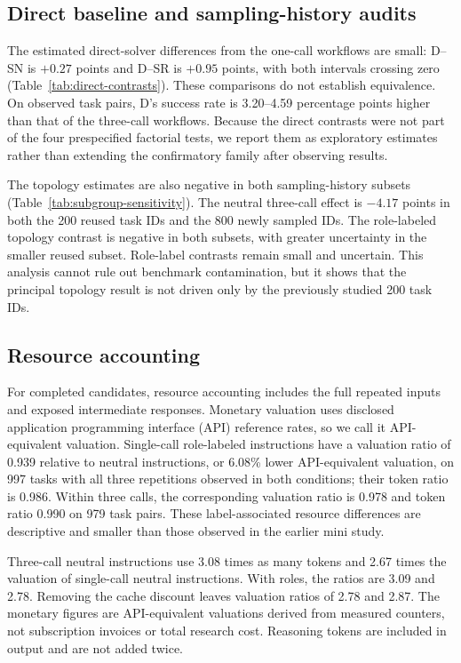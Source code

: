 

\subsection{Direct baseline and sampling-history audits}
The estimated direct-solver differences from the one-call workflows are small: D--SN is $+0.27$ points and D--SR is $+0.95$ points, with both intervals crossing zero (Table~\ref{tab:direct-contrasts}). These comparisons do not establish equivalence. On observed task pairs, D's success rate is 3.20--4.59 percentage points higher than that of the three-call workflows. Because the direct contrasts were not part of the four prespecified factorial tests, we report them as exploratory estimates rather than extending the confirmatory family after observing results.



The topology estimates are also negative in both sampling-history subsets (Table~\ref{tab:subgroup-sensitivity}). The neutral three-call effect is $-4.17$ points in both the 200 reused task IDs and the 800 newly sampled IDs. The role-labeled topology contrast is negative in both subsets, with greater uncertainty in the smaller reused subset. Role-label contrasts remain small and uncertain. This analysis cannot rule out benchmark contamination, but it shows that the principal topology result is not driven only by the previously studied 200 task IDs.




\subsection{Resource accounting}
For completed candidates, resource accounting includes the full repeated inputs and exposed intermediate responses. Monetary valuation uses disclosed application programming interface (API) reference rates, so we call it API-equivalent valuation. Single-call role-labeled instructions have a valuation ratio of 0.939 relative to neutral instructions, or 6.08\% lower API-equivalent valuation, on 997 tasks with all three repetitions observed in both conditions; their token ratio is 0.986. Within three calls, the corresponding valuation ratio is 0.978 and token ratio 0.990 on 979 task pairs. These label-associated resource differences are descriptive and smaller than those observed in the earlier mini study.

Three-call neutral instructions use 3.08 times as many tokens and 2.67 times the valuation of single-call neutral instructions. With roles, the ratios are 3.09 and 2.78. Removing the cache discount leaves valuation ratios of 2.78 and 2.87. The monetary figures are API-equivalent valuations derived from measured counters, not subscription invoices or total research cost. Reasoning tokens are included in output and are not added twice.


